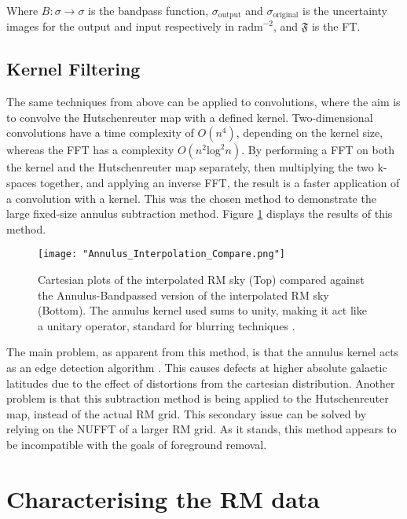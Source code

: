 Where $B\colon\sigma\rightarrow\sigma$ is the bandpass function, $\sigma_{\mathrm{output}}$ and $\sigma_{\mathrm{original}}$ is the uncertainty images for the output and input respectively in $\mathrm{rad m}^{-2}$, and $\mathbf{\mathfrak{F}}$ is the FT.

\subsection{Kernel Filtering}
\label{ssec:kernel}

The same techniques from above can be applied to convolutions, where the aim is to convolve the Hutschenreuter map with a defined kernel. Two-dimensional convolutions have a time complexity of $O(n^4)$, depending on the kernel size, whereas the FFT has a complexity $O(n^2 \mathrm{log}^2 n)$. By performing a FFT on both the kernel and the Hutschenreuter map separately, then multiplying the two k-spaces together, and applying an inverse FFT, the result is a faster application of a convolution with a kernel. This was the chosen method to demonstrate the large fixed-size annulus subtraction method. Figure \ref{fig:annulus_interpolation} displays the results of this method.

\begin{figure}
    \texttt{[image: "Annulus\_Interpolation\_Compare.png"]}
    \centering
    \caption{Cartesian plots of the interpolated RM sky (Top) compared against the Annulus-Bandpassed version of the interpolated RM sky (Bottom). The annulus kernel used sums to unity, making it act like a unitary operator, standard for blurring techniques \citep{ID38}.}
    \label{fig:annulus_interpolation}
\end{figure}

The main problem, as apparent from this method, is that the annulus kernel acts as an edge detection algorithm \citep{ID38}. This causes defects at higher absolute galactic latitudes due to the effect of distortions from the cartesian distribution. Another problem is that this subtraction method is being applied to the Hutschenreuter map, instead of the actual RM grid. This secondary issue can be solved by relying on the NUFFT of a larger RM grid. As it stands, this method appears to be incompatible with the goals of foreground removal.

\section{Characterising the RM data}
\label{sec:charm}

